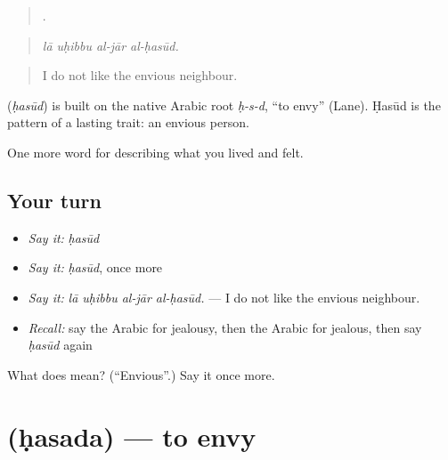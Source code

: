 \begin{quote}
   .
\end{quote}

\begin{quote}
\emph{lā uḥibbu al-jār al-ḥasūd.}
\end{quote}

\begin{quote}
I do not like the envious neighbour.
\end{quote}

\begin{cousinweb}
\textbf{} (\emph{ḥasūd}) is built on the native Arabic root \emph{ḥ-s-d}, \textquotedblleft{}to envy\textquotedblright{} (Lane). Ḥasūd is the pattern of a lasting trait: an envious person.
\end{cousinweb}

\begin{grammarlens}[title={What you've built}]
One more word for describing what you lived and felt.
\end{grammarlens}

\subsection*{Your turn}
\begin{itemize}
\raggedright
  \item \emph{Say it:} \emph{ḥasūd}
  \item \emph{Say it:} \emph{ḥasūd}, once more
  \item \emph{Say it:} \emph{lā uḥibbu al-jār al-ḥasūd.} — I do not like the envious neighbour.
  \item \emph{Recall:} say the Arabic for jealousy, then the Arabic for jealous, then say \emph{ḥasūd} again
\end{itemize}

\begin{tcolorbox}[breakable,colback=teal!4,colframe=teal!35!black,title={Before you move on}]
What does  mean? (\textquotedblleft{}Envious\textquotedblright{}.) Say it once more.
\end{tcolorbox}
\section[\texorpdfstring{\ar{حسد} (ḥasada)}{حسد (ḥasada)}]{ (ḥasada) — to envy}

\label{lesson:AR-C492-hasada-envy}



